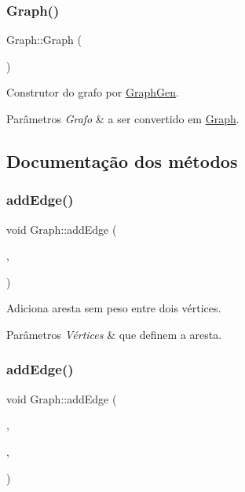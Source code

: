 \subsubsection{\texorpdfstring{Graph()}{Graph()}\hspace{0.1cm}{\footnotesize\ttfamily [3/3]}}
{\footnotesize\ttfamily Graph\+::\+Graph (\begin{DoxyParamCaption}\item[{\hyperlink{classGraphGen}{Graph\+Gen} \&}]{ }\end{DoxyParamCaption})}

Construtor do grafo por \hyperlink{classGraphGen}{Graph\+Gen}. 
\begin{DoxyParams}{Parâmetros}
{\em Grafo} & a ser convertido em \hyperlink{classGraph}{Graph}. \\
\hline
\end{DoxyParams}


\subsection{Documentação dos métodos}
\mbox{\label{classGraph_a9f627b8aaa697daabe0ed31bbd0953eb}} 
\subsubsection{\texorpdfstring{add\+Edge()}{addEdge()}\hspace{0.1cm}{\footnotesize\ttfamily [1/2]}}
{\footnotesize\ttfamily void Graph\+::add\+Edge (\begin{DoxyParamCaption}\item[{int}]{,  }\item[{int}]{ }\end{DoxyParamCaption})}

Adiciona aresta sem peso entre dois vértices. 
\begin{DoxyParams}{Parâmetros}
{\em Vértices} & que definem a aresta. \\
\hline
\end{DoxyParams}
\mbox{\label{classGraph_ad4155b07ec70e1d85787710452a2bcfa}} 
\subsubsection{\texorpdfstring{add\+Edge()}{addEdge()}\hspace{0.1cm}{\footnotesize\ttfamily [2/2]}}
{\footnotesize\ttfamily void Graph\+::add\+Edge (\begin{DoxyParamCaption}\item[{int}]{,  }\item[{int}]{,  }\item[{int}]{ }\end{DoxyParamCaption})}

